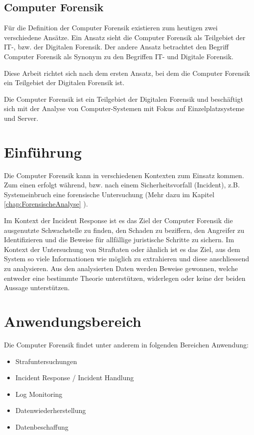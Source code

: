 \subsection{Computer Forensik}
Für die Definition der Computer Forensik existieren zum heutigen zwei verschiedene Ansätze. Ein Ansatz sieht die Computer Forensik als Teilgebiet der IT-, bzw. der Digitalen Forensik. Der andere Ansatz betrachtet den Begriff Computer Forensik als Synonym zu den Begriffen IT- und Digitale Forensik.

Diese Arbeit richtet sich nach dem ersten Ansatz, bei dem die Computer Forensik ein Teilgebiet der Digitalen Forensik ist.

Die Computer Forensik ist ein Teilgebiet der Digitalen Forensik und beschäftigt sich mit der Analyse von Computer-Systemen mit Fokus auf Einzelplatzsysteme und Server.

\section{Einführung}
Die Computer Forensik kann in verschiedenen Kontexten zum Einsatz kommen. Zum einen erfolgt während, bzw. nach einem Sicherheitsvorfall (Incident), z.B. Systemeinbruch eine forensische Untersuchung (Mehr dazu im Kapitel \ref{chap:ForensischeAnalyse} ). 

Im Kontext der Incident Response ist es das Ziel der Computer Forensik die ausgenutzte Schwachstelle zu finden, den Schaden zu beziffern, den Angreifer zu Identifizieren und die Beweise für allfällige juristische Schritte zu sichern. Im Kontext der Untersuchung von Straftaten oder ähnlich ist es das Ziel, aus dem System so viele Informationen wie möglich zu extrahieren und diese anschliessend zu analysieren. Aus den analysierten Daten werden Beweise gewonnen, welche entweder eine bestimmte Theorie unterstützen, widerlegen oder keine der beiden Aussage unterstützen. 


\section{Anwendungsbereich}
Die Computer Forensik findet unter anderem in folgenden Bereichen Anwendung:

\begin{itemize}
\item Strafuntersuchungen
\item Incident Response / Incident Handlung
\item Log Monitoring
\item Datenwiederherstellung
\item Datenbeschaffung
\end{itemize}


